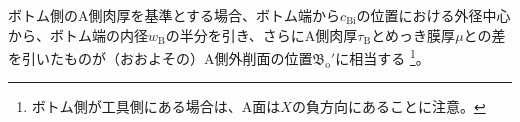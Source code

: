 ボトム側のA側肉厚を基準とする場合、ボトム端から$c_\mathrm{Bi}$の位置における外径中心から、ボトム端の内径$w_\mathrm B$の半分を引き、さらにA側肉厚$\tau_\mathrm B$とめっき膜厚$\mu$との差を引いたものが（おおよその）A側外削面の位置$\mathfrak B_\mathrm o'$に相当する
\footnote{ボトム側が工具側にある場合は、A面は$X$の負方向にあることに注意。}。


